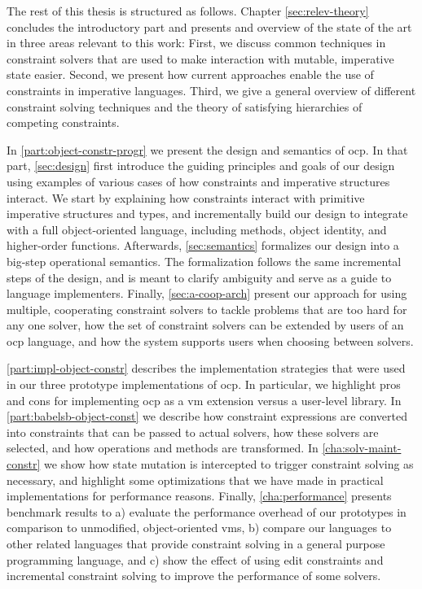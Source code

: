The rest of this thesis is structured as follows. Chapter
\ref{sec:relev-theory} concludes the introductory part and presents and overview
of the state of the art in three areas relevant to this work: First, we discuss
common techniques in constraint solvers that are used to make interaction with
mutable, imperative state easier. Second, we present how current approaches
enable the use of constraints in imperative languages. Third, we give a general
overview of different constraint solving techniques and the theory of satisfying
hierarchies of competing constraints.

In \autoref{part:object-constr-progr} we present the design and semantics of
\acrlong{ocp}. In that part, \autoref{sec:design} first introduce the guiding
principles and goals of our design using examples of various cases of how
constraints and imperative structures interact. We start by explaining how
constraints interact with primitive imperative structures and types, and
incrementally build our design to integrate with a full object-oriented
language, including methods, object identity, and higher-order functions.
Afterwards, \autoref{sec:semantics} formalizes our design into a big-step
operational semantics. The formalization follows the same incremental steps of
the design, and is meant to clarify ambiguity and serve as a guide to language
implementers. Finally, \autoref{sec:a-coop-arch} present our approach for using
multiple, cooperating constraint solvers to tackle problems that are too hard
for any one solver, how the set of constraint solvers can be extended by users
of an \ac{ocp} language, and how the system supports users when choosing between
solvers.


\autoref{part:impl-object-constr} describes the implementation strategies that
were used in our three prototype implementations of \ac{ocp}. In particular, we
highlight pros and cons for implementing \ac{ocp} as a \ac{vm} extension versus
a user-level library. In \autoref{part:babelsb-object-const} we describe how
constraint expressions are converted into constraints that can be passed to
actual solvers, how these solvers are selected, and how operations and methods
are transformed. In \autoref{cha:solv-maint-constr} we show how state mutation
is intercepted to trigger constraint solving as necessary, and highlight some
optimizations that we have made in practical implementations for performance
reasons. Finally, \autoref{cha:performance} presents benchmark results to a)
evaluate the performance overhead of our prototypes in comparison to unmodified,
object-oriented \acp{vm}, b) compare our languages to other related languages
that provide constraint solving in a general purpose programming language, and
c) show the effect of using edit constraints and incremental constraint solving
to improve the performance of some solvers.

